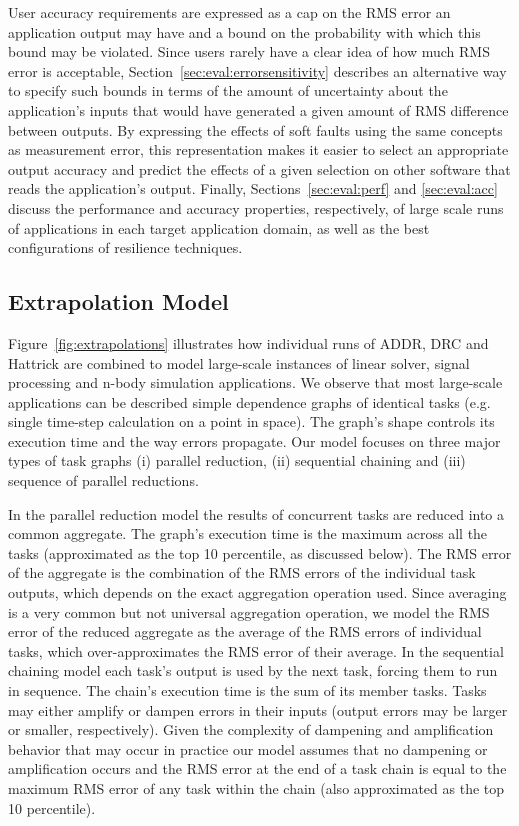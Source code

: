 \documentclass[10pt, conference, compsocconf]{IEEEtran}
\begin{document}
User accuracy requirements are expressed as a cap on the RMS error an application output may have and a bound on the probability with which this bound may be violated.
Since users rarely have a clear idea of how much RMS error is acceptable, Section~\ref{sec:eval:errorsensitivity} describes an alternative way to specify such bounds in terms of the amount of uncertainty about the application's inputs that would have generated a given amount of RMS difference between outputs.
By expressing the effects of soft faults using the same concepts as measurement error, this representation makes it easier to select an appropriate output accuracy and predict the effects of a given selection on other software that reads the application's output.
Finally, Sections~\ref{sec:eval:perf} and \ref{sec:eval:acc} discuss the performance and accuracy properties, respectively, of large scale runs of applications in each target application domain, as well as the best configurations of resilience techniques.

\subsection{Extrapolation Model}
\label{sec:eval:extrapolation}

Figure~\ref{fig:extrapolations} illustrates how individual runs of ADDR, DRC and Hattrick are combined to model large-scale instances of linear solver, signal processing and n-body simulation applications.
We observe that most large-scale applications can be described simple dependence graphs of identical tasks (e.g. single time-step calculation on a point in space).
The graph's shape controls its execution time and the way errors propagate.
Our model focuses on three major types of task graphs (i) parallel reduction, (ii) sequential chaining and (iii) sequence of parallel reductions.

In the parallel reduction model the results of concurrent tasks are reduced into a common aggregate.
The graph's execution time is the maximum across all the tasks (approximated as the top 10 percentile, as discussed below).
The RMS error of the aggregate is the combination of the RMS errors of the individual task outputs, which depends on the exact aggregation operation used.
Since averaging is a very common but not universal aggregation operation, we model the RMS error of the reduced aggregate as the average of the RMS errors of individual tasks, which over-approximates the RMS error of their average.
In the sequential chaining model each task's output is used by the next task, forcing them to run in sequence.
The chain's execution time is the sum of its member tasks.
Tasks may either amplify or dampen errors in their inputs (output errors may be larger or smaller, respectively).
Given the complexity of dampening and amplification behavior that may occur in practice our model assumes that no dampening or amplification occurs and the RMS error at the end of a task chain is equal to the maximum RMS error of any task within the chain (also approximated as the top 10 percentile).
\end{document}
